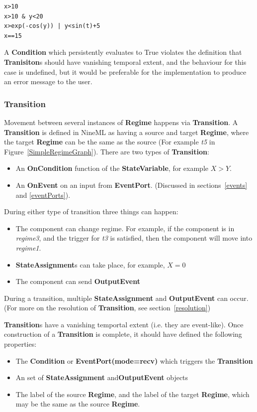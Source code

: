 \documentclass{article}
\newcommand{\nmlClass}[1]{{\bf #1}}
\newcommand{\StateVariable}{{\bf{StateVariable}}\xspace}
\newcommand{\StateAssignment}{{\bf{StateAssignment}}\xspace}
\newcommand{\EventPort}{{\bf{EventPort}}\xspace}
\newcommand{\Regime}{{\bf{Regime}}\xspace}
\newcommand{\Transition}{{\bf{Transition}}\xspace}
\newcommand{\OnEvent}{{\bf{OnEvent}}\xspace}
\newcommand{\OnCondition}{{\bf{OnCondition}}\xspace}
\newcommand{\OutputEvent}{{\bf{OutputEvent}}\xspace}
\begin{document}
\begin{verbatim}
x>10
x>10 & y<20
x>exp(-cos(y)) | y<sin(t)+5
x==15
\end{verbatim}

A \nmlClass{Condition} which persistently evaluates to True
violates the definition that \nmlClass{Tranisiton}s should have vanishing
temporal extent, and the behaviour for this case is undefined, but
it would be preferable for the implementation to produce an error
message to the user.

\subsubsection{Transition}

Movement between several instances of \Regime happens via \Transition.
A \nmlClass{Transition} is defined in NineML as having
a source and target \nmlClass{Regime}, where the target
\nmlClass{Regime} can be the same as the source (For example \emph{t5}
in Figure~\ref{SimpleRegimeGraph}). There are two types of \Transition:

\begin{itemize}
\item An \OnCondition function of the \StateVariable, for
example $X > Y$.
\item An \OnEvent on an input from \EventPort. (Discussed in sections~\ref{events} and \ref{eventPorts}).
\end{itemize}

During either type of transition three things can happen:
\begin{itemize}
\item The component can change regime. For example, if
the component is in \emph{regime3}, and the trigger for \emph{t3} is
satisfied, then the component will move into \emph{regime1}.
\item \textbf{StateAssignment}s can take place, for example, $X=0$
\item The component can send \OutputEvent
\end{itemize}

During a transition, multiple \StateAssignment and \OutputEvent can occur.
(For more on the resolution of \Transition, see section~\ref{resolution})

\nmlClass{Transition}s have a vanishing temportal extent (i.e. they are
event-like). Once construction of a \nmlClass{Transition} is complete, it
should have defined the following properties:
\begin{itemize}
\item The \nmlClass{Condition} or \nmlClass{EventPort(mode=recv)} which
triggers the \nmlClass{Transition}
\item An set of \StateAssignment and\OutputEvent objects
\item The label of the source \nmlClass{Regime}, and the label of the target
\nmlClass{Regime}, which may be the same as the source \nmlClass{Regime}.
\end{itemize}
\end{document}

